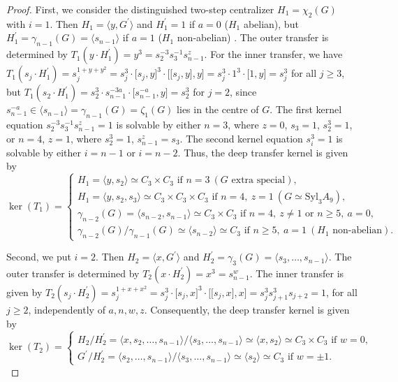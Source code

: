\documentclass{amsart}
\theoremstyle{definition}
\numberwithin{equation}{section}
\begin{document}
\begin{proof}
First, we consider the distinguished two-step centralizer \(H_1=\chi_2(G)\) with \(i=1\).
Then \(H_1=\langle y,G^\prime\rangle\) and \(H_1^\prime=1\) if \(a=0\) (\(H_1\) abelian),
but \(H_1^\prime=\gamma_{n-1}(G)=\langle s_{n-1}\rangle\) if \(a=1\) (\(H_1\) non-abelian)
\cite[Eqn. (3), p. 470]{Ma2}.
The outer transfer is determined by \(T_1(y\cdot H_1^\prime)=y^3=s_2^{-3}s_3^{-1}s_{n-1}^z\).
For the inner transfer, we have
\(T_1(s_j\cdot H_1^\prime)=s_j^{1+y+y^2}=s_j^3\cdot\lbrack s_j,y\rbrack^3\cdot\lbrack\lbrack s_j,y\rbrack,y\rbrack=s_j^3\cdot 1^3\cdot\lbrack 1,y\rbrack=s_j^3\)
for all \(j\ge 3\), but \(T_1(s_2\cdot H_1^\prime)=s_2^3\cdot s_{n-1}^{-3a}\cdot\lbrack s_{n-1}^{-a},y\rbrack=s_2^3\) for \(j=2\),
since \(s_{n-1}^{-a}\in\langle s_{n-1}\rangle=\gamma_{n-1}(G)=\zeta_1(G)\) lies in the centre of \(G\).
The first kernel equation \(s_2^{-3}s_3^{-1}s_{n-1}^z=1\) is solvable by
either \(n=3\), where \(z=0\), \(s_3=1\), \(s_2^3=1\),
or \(n=4\), \(z=1\), where \(s_2^3=1\), \(s_{n-1}^z=s_3\).
The second kernel equation \(s_i^3=1\) is solvable by either \(i=n-1\) or \(i=n-2\).
Thus, the deep transfer kernel is given by
\begin{equation}
\label{eqn:dTKT1}
\ker(T_1)=
\begin{cases}
H_1=\langle y,s_2\rangle\simeq C_3\times C_3 \text{ if } n=3\ (G \text{ extra special}), \\
H_1=\langle y,s_2,s_3\rangle\simeq C_3\times C_3\times C_3 \text{ if } n=4,\ z=1\ (G\simeq\mathrm{Syl}_3A_9), \\
\gamma_{n-2}(G)=\langle s_{n-2},s_{n-1}\rangle\simeq C_3\times C_3 \text{ if } n=4,\ z\ne 1 \text{ or } n\ge 5,\ a=0, \\
\gamma_{n-2}(G)/\gamma_{n-1}(G)\simeq\langle s_{n-2}\rangle\simeq C_3 \text{ if } n\ge 5,\ a=1\ (H_1 \text{ non-abelian}).
\end{cases}
\end{equation}

Second, we put \(i=2\).
Then \(H_2=\langle x,G^\prime\rangle\) and \(H_2^\prime=\gamma_3(G)=\langle s_3,\ldots,s_{n-1}\rangle\).
The outer transfer is determined by \(T_2(x\cdot H_2^\prime)=x^3=s_{n-1}^w\).
The inner transfer is given by
\(T_2(s_j\cdot H_2^\prime)=s_j^{1+x+x^2}=s_j^3\cdot\lbrack s_j,x\rbrack^3\cdot\lbrack\lbrack s_j,x\rbrack,x\rbrack=s_j^3s_{j+1}^3s_{j+2}=1\),
for all \(j\ge 2\), independently of \(a,n,w,z\).
Consequently, the deep transfer kernel is given by
\begin{equation}
\label{eqn:dTKT2}
\ker(T_2)=
\begin{cases}
H_2/H_2^\prime=\langle x,s_2,\ldots,s_{n-1}\rangle/\langle s_3,\ldots,s_{n-1}\rangle\simeq\langle x,s_2\rangle\simeq C_3\times C_3\text{ if } w=0, \\
G^\prime/H_2^\prime=\langle s_2,\ldots,s_{n-1}\rangle/\langle s_3,\ldots,s_{n-1}\rangle\simeq\langle s_2\rangle\simeq C_3\text{ if } w=\pm 1.
\end{cases}
\end{equation}


\end{proof}
\end{document}
